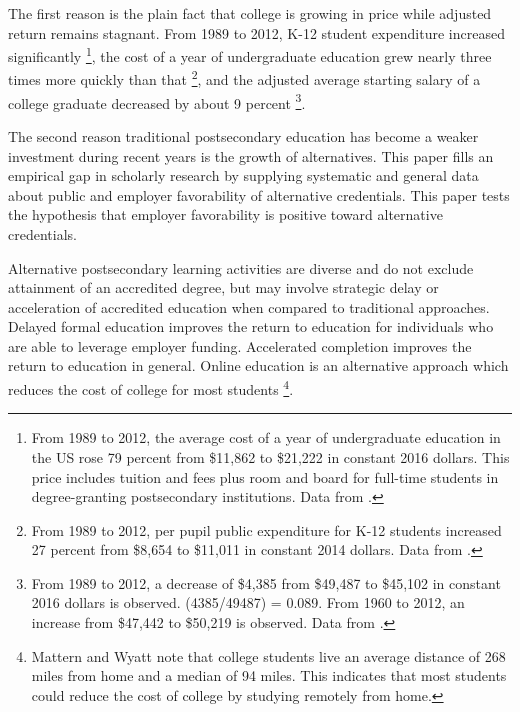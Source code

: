 \documentclass[AER]{./aea-latex-templates/AEA}
\begin{document}
        The first reason is the plain fact that college is growing in price while adjusted return remains stagnant.
        From 1989 to 2012, K-12 student expenditure increased significantly
        \footnote{
            From 1989 to 2012, the average cost of a year of undergraduate education in the US rose 79 percent
            from \$11,862 to \$21,222 in constant 2016 dollars.
            This price includes tuition and fees plus room and board for full-time students in degree-granting postsecondary institutions.
            Data from \cite{nces2017averageundergraduatetuition}.
        },
        the cost of a year of undergraduate education grew nearly three times more quickly than that
        \footnote{
            From 1989 to 2012, per pupil public expenditure for K-12 students increased 27 percent
            from \$8,654 to \$11,011 in constant 2014 dollars. Data from \cite{nces2015expendituresperpupil}.
        },
        and the adjusted average starting salary of a college graduate decreased by about 9 percent
        \footnote{
            From 1989 to 2012, a decrease of \$4,385 from \$49,487 to \$45,102 in constant 2016 dollars is observed. (4385/49487) = 0.089.
            From 1960 to 2012, an increase from \$47,442 to \$50,219 is observed. Data from \cite{koncz2016}.
        }.

        The second reason traditional postsecondary education has become a
        weaker investment during recent years is the growth of alternatives.
        This paper fills an empirical gap in scholarly research by supplying
        systematic and general data about public and employer favorability of
        alternative credentials.
        This paper tests the hypothesis that employer favorability is positive toward alternative credentials.
        
        Alternative postsecondary learning activities are diverse and do not
        exclude attainment of an accredited degree, but may involve strategic
        delay or acceleration of accredited education when compared to traditional approaches.
        Delayed formal education improves the return to education for
        individuals who are able to leverage employer funding. Accelerated completion improves the return to education in general.
        Online education is an alternative approach which reduces the cost of college for most students
        \footnote{
            Mattern and Wyatt\cite{mattern2009student} note that college students live an average distance of
            268 miles from home and a median of 94 miles. This indicates that most students could reduce
            the cost of college by studying remotely from home.
        }.
        
\end{document}
